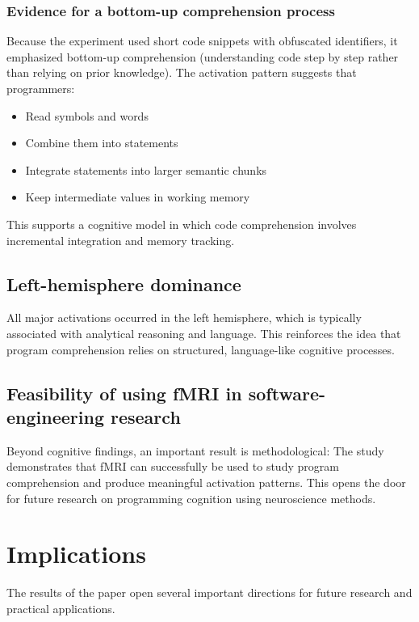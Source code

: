 \subsubsection{Evidence for a bottom-up comprehension process}

Because the experiment used short code snippets with obfuscated identifiers, it emphasized bottom-up comprehension (understanding code step by step rather than relying on prior knowledge). The activation pattern suggests that programmers:
\begin{itemize}
    \item Read symbols and words
    \item Combine them into statements
    \item Integrate statements into larger semantic chunks
    \item Keep intermediate values in working memory
\end{itemize}
This supports a cognitive model in which code comprehension involves incremental integration and memory tracking.

\subsection{Left-hemisphere dominance}

All major activations occurred in the left hemisphere, which is typically associated with analytical reasoning and language. This reinforces the idea that program comprehension relies on structured, language-like cognitive processes.

\subsection{Feasibility of using fMRI in software-engineering research}

Beyond cognitive findings, an important result is methodological:
The study demonstrates that fMRI can successfully be used to study program comprehension and produce meaningful activation patterns. This opens the door for future research on programming cognition using neuroscience methods.

\section{Implications}

The results of the paper open several important directions for future research and practical applications.

